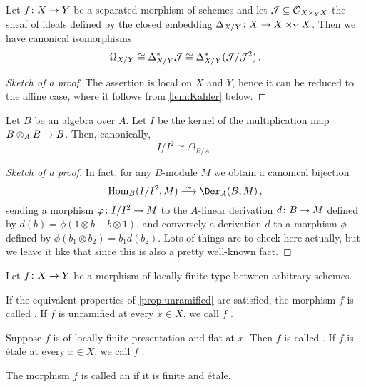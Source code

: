 \documentclass[a4paper, 10pt, oneside, DIV=9, chapterprefix=true, numbers=enddot, bibliography=totoc]{scrbook}
\begin{document}
\begin{prop}\label{prop:Kahler}
	Let $f\colon X\morphism Y$ be a separated morphism of schemes and let $\mathcal{J}\subseteq \mathcal{O}_{X\times_YX}$ the sheaf of ideals defined by the closed embedding $\Delta_{X/Y}\colon X\morphism X\times_YX$. Then we have canonical isomorphisms
	\begin{equation*}
		\Omega_{X/Y}\cong \Delta_{X/Y}^*\mathcal{J}\cong \Delta_{X/Y}^*(\mathcal{J}/\mathcal{J}^2)\,.
	\end{equation*}
\end{prop}
\begin{proof}[Sketch of a proof]
	The assertion is local on $X$ and $Y$, hence it can be reduced to the affine case, where it follows from \cref{lem:Kahler} below.
\end{proof}
\begin{lem}\label{lem:Kahler}
	Let $B$ be an algebra over $A$. Let $I$ be the kernel of the multiplication map $B\otimes_AB\morphism B$. Then, canonically, 
	\begin{equation*}
		I/I^2\cong \Omega_{B/A}\,.
	\end{equation*}
\end{lem}
\begin{proof}[Sketch of a proof]
In fact, for any $B$-module $M$ we obtain a canonical bijection
\begin{equation*}
\Hom_B(I/I^2,M)\isomorphism \Der_A(B,M)\,,
\end{equation*}
sending a morphism $\phi\colon I/I^2\morphism M$ to the $A$-linear derivation $d\colon B\morphism M$ defined by $d(b)=\phi(1\otimes b - b\otimes 1)$, and conversely a derivation $d$ to a morphism $\phi$ defined by $\phi(b_1\otimes b_2)=b_1d(b_2)$. Lots of things are to check here actually, but we leave it like that since this is also a pretty well-known fact.
\end{proof}
\begin{defi}\label{def:etale}
	Let $f\colon X\morphism Y$ be a morphism of locally finite type between arbitrary schemes.
	\begin{alphanumerate}
		\item If the equivalent properties of \cref{prop:unramified} are satisfied, the morphism $f$ is called . If $f$ is unramified at every $x\in X$, we call $f$ .
		\item Suppose $f$ is of locally finite presentation and flat at $x$. Then $f$ is called . If $f$ is étale at every $x\in X$, we call $f$ .
		\item The morphism $f$ is called an  if it is finite and étale.
	\end{alphanumerate}
\end{defi}
\end{document}
